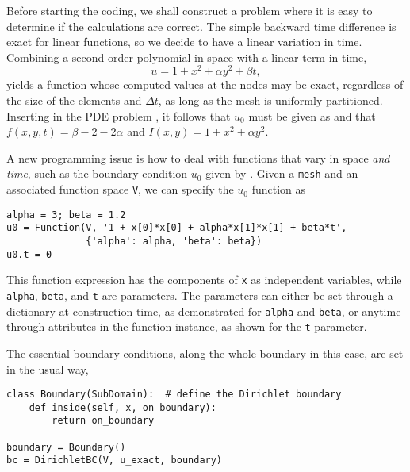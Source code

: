 Before starting the coding, we shall construct a problem where it is
easy to determine if the calculations are correct. The simple backward
time difference is exact for linear functions, so we decide to have
a linear variation in time. Combining a second-order polynomial in space
with a linear term in time,
\begin{equation} u = 1 + x^2 + \alpha y^2 + \beta t,
\label{langtangen:diffusion:pde1:u0test}
\end{equation}
yields a function whose computed values at the nodes may be exact,
regardless of the size of the elements and $\Delta t$, as long as the
mesh is uniformly partitioned.
Inserting  in the PDE problem
, it follows that $u_0$ must be given as
 and that $f(x,y,t)=\beta - 2 - 2\alpha$
and $I(x,y)=1+x^2+\alpha y^2$.


A new programming issue is 
how to deal with functions that vary in space \emph{and time}, such as
the boundary condition $u_0$ given by .
Given a {\fontsize{12pt}{12pt}\texttt{mesh}} and an associated function space {\fontsize{12pt}{12pt}\texttt{V}}, we 
can specify the $u_0$ function as
\begin{Verbatim}[fontsize=\fontsize{10pt}{10pt},tabsize=8,baselinestretch=1.05,
fontfamily=tt,xleftmargin=7mm]
alpha = 3; beta = 1.2
u0 = Function(V, '1 + x[0]*x[0] + alpha*x[1]*x[1] + beta*t',
              {'alpha': alpha, 'beta': beta})
u0.t = 0
\end{Verbatim}
\noindent
This function expression has the components of {\fontsize{12pt}{12pt}\texttt{x}} as independent
variables, while {\fontsize{12pt}{12pt}\texttt{alpha}}, {\fontsize{12pt}{12pt}\texttt{beta}}, and {\fontsize{12pt}{12pt}\texttt{t}} are parameters.
The parameters can either be set through a dictionary at construction time, 
as demonstrated for {\fontsize{12pt}{12pt}\texttt{alpha}} and {\fontsize{12pt}{12pt}\texttt{beta}}, or anytime through 
attributes in the function
instance, as shown for the {\fontsize{12pt}{12pt}\texttt{t}} parameter.

The essential boundary conditions, along the whole boundary in this case, 
are set in the usual way,
\begin{Verbatim}[fontsize=\fontsize{10pt}{10pt},tabsize=8,baselinestretch=1.05,
fontfamily=tt,xleftmargin=7mm]
class Boundary(SubDomain):  # define the Dirichlet boundary
    def inside(self, x, on_boundary):
        return on_boundary

boundary = Boundary()
bc = DirichletBC(V, u_exact, boundary)
\end{Verbatim}
\noindent

